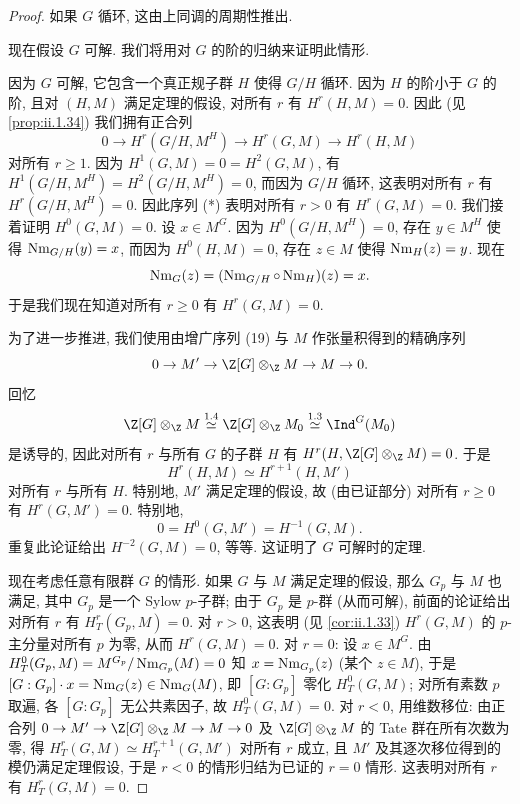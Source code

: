 \begin{proof}
如果 $G$ 循环, 这由上同调的周期性推出.

现在假设 $G$ 可解. 我们将用对 $G$ 的阶的归纳来证明此情形.

因为 $G$ 可解, 它包含一个真正规子群 $H$ 使得 $G/H$ 循环. 因为 $H$ 的阶小于 $G$ 的阶, 且对 $(H,M)$ 满足定理的假设, 对所有 $r$ 有 $H^r(H,M)=0$. 因此 (见 \ref{prop:ii.1.34}) 我们拥有正合列
\begin{equation*}
 0\to H^r(G/H,M^H)\to H^r(G,M)\to H^r(H,M)
\tag{$*$}
\end{equation*}
对所有 $r\ge 1$. 因为 $H^1(G,M)=0=H^2(G,M)$, 有 $H^1(G/H,M^H)=H^2(G/H,M^H)=0$, 而因为 $G/H$ 循环, 这表明对所有 $r$ 有 $H^r(G/H,M^H)=0$. 因此序列 (*) 表明对所有 $r>0$ 有 $H^r(G,M)=0$. 我们接着证明 $H^0(G,M)=0$. 设 $x\in M^G$. 因为 $H^0(G/H,M^H)=0$, 存在 $y\in M^H$ 使得 $\operatorname{Nm}_{G/H}(y)=x$, 而因为 $H^0(H,M)=0$, 存在 $z\in M$ 使得 $\operatorname{Nm}_H(z)=y$. 现在
\[
 \operatorname{Nm}_G(z)=(\operatorname{Nm}_{G/H}\circ \operatorname{Nm}_H)(z)=x.
\]
于是我们现在知道对所有 $r\ge 0$ 有 $H^r(G,M)=0$.

为了进一步推进, 我们使用由增广序列 (19) 与 $M$ 作张量积得到的精确序列
\[
 0\to M'\to \Z[G]\otimes_\Z M\to M\to 0.
\]
回忆
\[
 \Z[G]\otimes_\Z M\overset{1.4}{\simeq}\Z[G]\otimes_\Z M_0\overset{1.3}{\simeq}\Ind^G(M_0)
\]
是诱导的, 因此对所有 $r$ 与所有 $G$ 的子群 $H$ 有 $H^r(H,\Z[G]\otimes_\Z M)=0$. 于是
\[
 H^r(H,M)\simeq H^{r+1}(H,M')
\]
对所有 $r$ 与所有 $H$. 特别地, $M'$ 满足定理的假设, 故 (由已证部分) 对所有 $r\ge 0$ 有 $H^r(G,M')=0$. 特别地,
\[
 0=H^0(G,M')=H^{-1}(G,M).
\]
重复此论证给出 $H^{-2}(G,M)=0$, 等等. 这证明了 $G$ 可解时的定理.

现在考虑任意有限群 $G$ 的情形. 如果 $G$ 与 $M$ 满足定理的假设, 那么 $G_p$ 与 $M$ 也满足, 其中 $G_p$ 是一个 Sylow $p$-子群; 由于 $G_p$ 是 $p$-群 (从而可解), 前面的论证给出对所有 $r$ 有 $H_T^r(G_p,M)=0$. 对 $r>0$, 这表明 (见 \ref{cor:ii.1.33}) $H^r(G,M)$ 的 $p$-主分量对所有 $p$ 为零, 从而 $H^r(G,M)=0$. 对 $r=0$: 设 $x\in M^G$. 由 $H_T^0(G_p,M)=M^{G_p}/\operatorname{Nm}_{G_p}(M)=0$ 知 $x=\operatorname{Nm}_{G_p}(z)$ (某个 $z\in M$), 于是 $[G:G_p]\cdot x=\operatorname{Nm}_G(z)\in\operatorname{Nm}_G(M)$, 即 $[G:G_p]$ 零化 $H_T^0(G,M)$; 对所有素数 $p$ 取遍, 各 $[G:G_p]$ 无公共素因子, 故 $H_T^0(G,M)=0$. 对 $r<0$, 用维数移位: 由正合列 $0\to M'\to\Z[G]\otimes_\Z M\to M\to 0$ 及 $\Z[G]\otimes_\Z M$ 的 Tate 群在所有次数为零, 得 $H_T^r(G,M)\simeq H_T^{r+1}(G,M')$ 对所有 $r$ 成立, 且 $M'$ 及其逐次移位得到的模仍满足定理假设, 于是 $r<0$ 的情形归结为已证的 $r=0$ 情形. 这表明对所有 $r$ 有 $H_T^r(G,M)=0$.
\end{proof}

